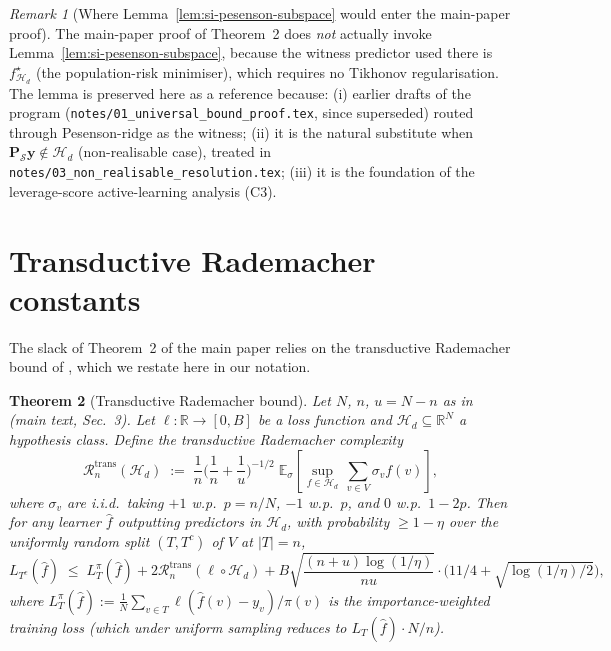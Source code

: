 \documentclass[11pt,a4paper]{article}
\theoremstyle{plain}
\newtheorem{theorem}{Theorem}
\theoremstyle{definition}
\theoremstyle{remark}
\newtheorem{remark}[theorem]{Remark}
\newcommand{\by}{\mathbf{y}}
\newcommand{\bP}{\mathbf{P}}
\newcommand{\E}{\mathbb{E}}
\newcommand{\R}{\mathbb{R}}
\newcommand{\Scal}{\mathcal{S}}
\newcommand{\Hcal}{\mathcal{H}}
\newcommand{\maintext}[1]{(main text, Sec.~#1)}
\begin{document}
\begin{remark}[Where Lemma~\ref{lem:si-pesenson-subspace} would enter the
main-paper proof]
\label{rem:si-when-pesenson}
The main-paper proof of Theorem~2 does \emph{not} actually invoke
Lemma~\ref{lem:si-pesenson-subspace}, because the witness predictor
used there is $f^\star_{\Hcal_d}$ (the population-risk minimiser), which
requires no Tikhonov regularisation.  The lemma is preserved here as a
reference because: (i) earlier drafts of the program
(\texttt{notes/01\_universal\_bound\_proof.tex}, since superseded)
routed through Pesenson-ridge as the witness; (ii) it is the natural
substitute when $\bP_\Scal\by \notin \Hcal_d$ (non-realisable case),
treated in \texttt{notes/03\_non\_realisable\_resolution.tex}; (iii)
it is the foundation of the leverage-score active-learning analysis
(C3).
\end{remark}

\section{Transductive Rademacher constants}
\label{sec:si-B}

The slack of Theorem~2 of the main paper relies on the transductive
Rademacher bound of \citet[][Theorem~1]{ElYanivPechyony2006}, which we
restate here in our notation.

\begin{theorem}[Transductive Rademacher bound]
\label{thm:si-trans-rademacher}
Let $N$, $n$, $u = N - n$ as in \maintext{3}.  Let $\ell : \R \to [0,
B]$ be a loss function and $\Hcal_d \subseteq \R^N$ a hypothesis
class.  Define the transductive Rademacher complexity
\begin{equation}
    \mathcal{R}_n^{\mathrm{trans}}(\Hcal_d)
    \;:=\; \frac{1}{n}\Big(\frac{1}{n} + \frac{1}{u}\Big)^{-1/2}
        \;\E_\sigma\!\!\left[\sup_{f \in \Hcal_d}\,\sum_{v \in V}\sigma_v f(v)\right],
    \label{eq:si-trans-rademacher-defn}
\end{equation}
where $\sigma_v$ are i.i.d.\ taking $+1$ w.p.\ $p = n/N$, $-1$ w.p.\
$p$, and $0$ w.p.\ $1 - 2p$.  Then for any learner $\hat f$ outputting
predictors in $\Hcal_d$, with probability $\geq 1 - \eta$ over the
uniformly random split $(T, T^c)$ of $V$ at $|T| = n$,
\begin{equation}
    L_{T^c}(\hat f) \;\leq\; L_T^\pi(\hat f)
        + 2 \mathcal{R}_n^{\mathrm{trans}}(\ell \circ \Hcal_d)
        + B \sqrt{\frac{(n + u)\log(1/\eta)}{n u}}
        \cdot \big(11/4 + \sqrt{\log(1/\eta)/2}\big),
    \label{eq:si-trans-rademacher-bound}
\end{equation}
where $L_T^\pi(\hat f) := \frac{1}{N}\sum_{v \in T}\ell(\hat f(v) - y_v)/\pi(v)$
is the importance-weighted training loss (which under uniform
sampling reduces to $L_T(\hat f) \cdot N/n$).
\end{theorem}
\end{document}
